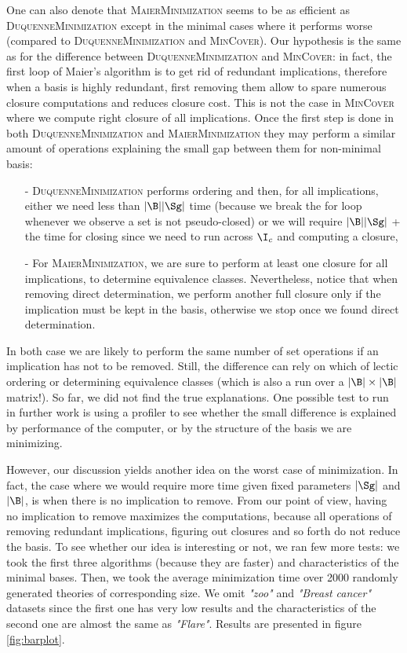 One can also denote that \textsc{MaierMinimization} seems to be as efficient as \textsc{DuquenneMinimization} except in the minimal cases where it performs worse (compared to \textsc{DuquenneMinimization} and \textsc{MinCover}). Our hypothesis is the same as for the difference between \textsc{DuquenneMinimization} and \textsc{MinCover}: in fact, the first loop of Maier's algorithm is to get rid of redundant implications, therefore when a 
basis is highly redundant, first removing them allow to spare numerous closure
computations and reduces closure cost. This is not the case in \textsc{MinCover}
where we compute right closure of all implications. Once the first step is done
in both \textsc{DuquenneMinimization} and \textsc{MaierMinimization} they may perform a similar amount of operations explaining the small gap between them for
non-minimal basis:
\begin{itemize}
	\item[-] \textsc{DuquenneMinimization} performs ordering and then, for 
	all implications, either we need less than $|\B||\Sg|$ time (because we break the for loop whenever we observe a set is not pseudo-closed) or we
	will require $|\B||\Sg|$ + the time for closing since we need to run across $\I_c$ and computing a closure, 
	\item[-] For \textsc{MaierMinimization}, we are sure to perform at least
	one closure for all implications, to determine equivalence classes. Nevertheless, notice that when removing direct determination, we perform 
	another full closure only if the implication must be kept in the basis,
	otherwise we stop once we found direct determination.
\end{itemize}
\noindent In both case we are likely to perform the same number of set operations if an implication has not to be removed. Still, the difference
can rely on which of lectic ordering or determining equivalence classes (which is also a run over a $|\B|\times|\B|$ matrix!). So far, we did not find 
the true explanations. One possible test to run in further work is using a profiler to see whether the small difference is explained by performance of 
the computer, or by the structure of the basis we are minimizing.

\vspace{1.2em}

However, our discussion yields another idea on the worst case of minimization. In fact, the case where we would require more time given fixed parameters $|\Sg|$ and $|\B|$, is when there is no implication to remove. From our point of view, having no implication to remove maximizes the computations, because all operations of removing redundant implications, figuring out closures and so forth do not reduce the basis. To see whether our idea is interesting or not, we ran few more tests: we took the first three algorithms (because they are faster) and characteristics of the minimal bases. Then, we took the average
minimization time over 2000 randomly generated theories of corresponding size.
We omit \textit{"zoo"} and \textit{"Breast cancer"} datasets since the first one has very low results and the characteristics of the second one are almost
the same as \textit{"Flare"}. Results are presented in figure \ref{fig:barplot}.

